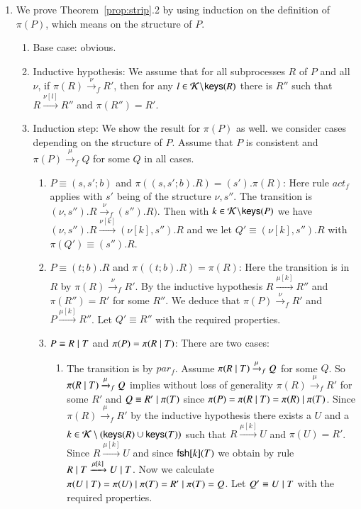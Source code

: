 \begin{pf}
\begin{enumerate}
\begin{enumerate}
\end{enumerate}
%
%
\item We prove Theorem~\ref{prop:strip}.2 by using induction on the definition of $\pi(P)$, which means on the structure of $P$.
\begin{enumerate}
\item Base case: obvious.
\item Inductive hypothesis: We assume that for all subprocesses $R$ of $P$ and all $\nu$, 
if $\pi(R) \xrightarrow{\nu}_f R'$, then for any $l\in \mathcal{K} \!\setminus\!\mathsf{keys}(R)$ there is 
$R''$ such that $R \xrightarrow{\nu[l]} R''$ and $\pi(R'')=R'$.
\item Induction step: We show the result for $\pi(P)$ as well.  we consider cases depending 
on the structure of $P$. Assume that $P$ is consistent and $\pi(P) \xrightarrow{\mu}_f Q$ 
for some $Q$ in all cases.
\begin{enumerate}
\item $P \equiv (s,s';b)$ and $\pi((s,s';b).R) = (s').\pi(R)$: Here rule $act_f$ applies with 
$s'$ being of the structure $\nu, s''$. The transition is $(\nu,s'').R \xrightarrow{\nu}_f (s'').R)$.
Then with $k \in \mathcal{K} \!\setminus\!\mathsf{keys}(P)$ we have $(\nu, s'').R \xrightarrow{\nu[k]} (\nu[k], s'').R$ 
and we let $Q' \equiv (\nu[k], s'').R$ with $\pi(Q') \equiv (s'').R$.
\item $P \equiv (t;b).R$ and $\pi((t;b).R)=\pi(R)$: Here the transition is in $R$ by $\pi(R) \xrightarrow{\nu}_f R'$. By the inductive hypothesis $R \xrightarrow{\mu[k]} R''$ and $\pi(R'')=R'$ for some $R''$. 
We deduce that $\pi(P)  \xrightarrow{\nu}_f R'$ and $P \xrightarrow{\mu[k]} R''$. Let $Q' \equiv R''$ with the required properties.
\item $P \equiv R \; \vert \; T$ and $\pi(P) = \pi(R \; \vert \; T)$: There are two cases:
\begin{enumerate}
\item The transition is by $par_f$. Assume $\pi(R \; \vert \; T) \xrightarrow{\mu}_f Q$ for some $Q$. So $\pi(R \; \vert \; T) \xrightarrow{\mu}_f Q$ implies without loss of generality $\pi(R) \xrightarrow{\mu}_f R'$ for some $R'$ and $Q \equiv R' \; \vert \; \pi(T)$ since $\pi(P)=\pi(R \; \vert \; T)=\pi(R) \; \vert \; \pi(T)$.  Since $\pi(R) \xrightarrow{\mu}_f R'$ by the inductive hypothesis there exists a $U$ and a $k \in \mathcal{K} \setminus (\mathsf{keys}(R) \cup \mathsf{keys}(T))$ such that $R \xrightarrow{\mu[k]} U$ and $\pi(U)=R'$. Since $R \xrightarrow{\mu[k]} U$ and since $\mathsf{fsh}[k](T)$ we obtain by rule  $R \; \vert \; T \xrightarrow{\mu[k]} U \; \vert \; T$. Now we calculate $\pi(U \; \vert \; T) = \pi(U) \; \vert \; \pi(T) = R' \; \vert \; \pi(T) = Q$. Let $Q' \equiv U \; \vert \; T$ with the required properties.

\end{enumerate}
\end{enumerate}
\end{enumerate}
\end{enumerate}
\end{pf}
